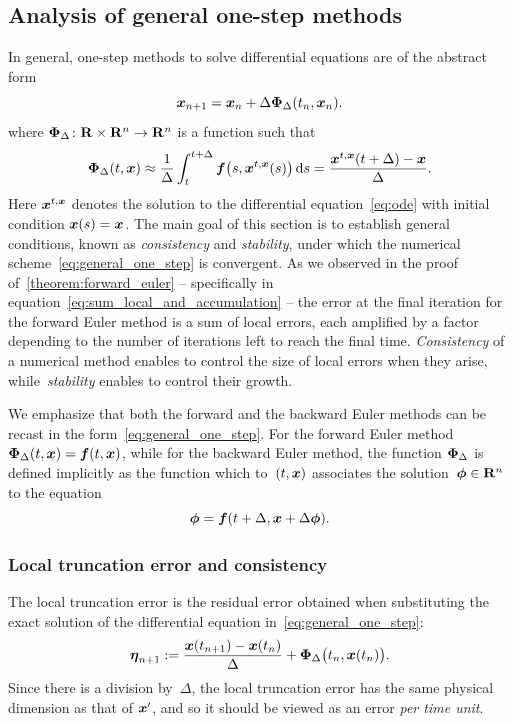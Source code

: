 \subsection{Analysis of general one-step methods}
\label{sub:one_step_general}
In general, one-step methods to solve differential equations are of the abstract form
\begin{equation}
    \label{eq:general_one_step}
    \mathbf{\boldsymbol{x}}_{n+1} = \mathbf{\boldsymbol{x}}_n + \Delta \mathbf{\boldsymbol{\Phi}}_{\Delta}(t_n, \mathbf{\boldsymbol{x}}_n).
\end{equation}
where $\mathbf{\boldsymbol{\Phi}}_{\Delta}\colon \mathbf R \times \mathbf R^n \to \mathbf R^n$ is a function such that
\begin{equation}
    \label{eq:one_step_integral}
    \mathbf{\boldsymbol{\Phi}}_{\Delta}(t, \mathbf{\boldsymbol{x}})
    \approx \frac{1}{\Delta} \int_{t}^{t+\Delta} \mathbf{\boldsymbol{f}}\bigl(s, \mathbf{\boldsymbol{x}}^{t, \mathbf{\boldsymbol{x}}}(s)\bigr) \, \mathrm d s
    = \frac{\mathbf{\boldsymbol{x}}^{t, \mathbf{\boldsymbol{x}}}(t + \Delta) - \mathbf{\boldsymbol{x}}}{\Delta}.
\end{equation}
Here $\mathbf{\boldsymbol{x}}^{t, \mathbf{\boldsymbol{x}}}$ denotes the solution to the differential equation~\eqref{eq:ode} with initial condition $\mathbf{\boldsymbol{x}}(s) = \mathbf{\boldsymbol{x}}$.
The main goal of this section is to establish general conditions,
known as \emph{consistency} and \emph{stability},
under which the numerical scheme~\eqref{eq:general_one_step} is convergent.
As we observed in the proof of~\cref{theorem:forward_euler}
-- specifically in equation~\eqref{eq:sum_local_and_accumulation} --
the error at the final iteration for the forward Euler method is a sum of local errors,
each amplified by a factor depending to the number of iterations left to reach the final time.
\emph{Consistency} of a numerical method enables to control the size of local errors when they arise,
while~\emph{stability} enables to control their growth.

We emphasize that both the forward and the backward Euler methods can be recast in the form~\eqref{eq:general_one_step}.
For the forward Euler method $\mathbf{\boldsymbol{\Phi}}_{\Delta}(t, \mathbf{\boldsymbol{x}}) = \mathbf{\boldsymbol{f}}(t, \mathbf{\boldsymbol{x}})$,
while for the backward Euler method, the function $\mathbf{\boldsymbol{\Phi}}_{\Delta}$ is defined implicitly as the function which to~$(t, \mathbf{\boldsymbol{x}})$ associates the solution~$\mathbf{\boldsymbol{\phi}} \in \mathbf R^n$ to the equation
\[
    \mathbf{\boldsymbol{\phi}} = \mathbf{\boldsymbol{f}}(t + \Delta, \mathbf{\boldsymbol{x}} + \Delta \mathbf{\boldsymbol{\phi}}).
\]
\subsubsection*{Local truncation error and consistency}%
The local truncation error is the residual error obtained when substituting the exact solution of the differential equation in~\eqref{eq:general_one_step}:
\[
    \mathbf{\boldsymbol{\eta}}_{n+1} := \frac{\mathbf{\boldsymbol{x}}(t_{n+1}) - \mathbf{\boldsymbol{x}}(t_n)}{\Delta} + \mathbf{\boldsymbol{\Phi}}_{\Delta}\bigl(t_n, \mathbf{\boldsymbol{x}}(t_n)\bigr).
\]
Since there is a division by~$\Delta$, the local truncation error has the same physical dimension as that of $\mathbf{\boldsymbol{x}}'$,
and so it should be viewed as an error \emph{per time unit}.

